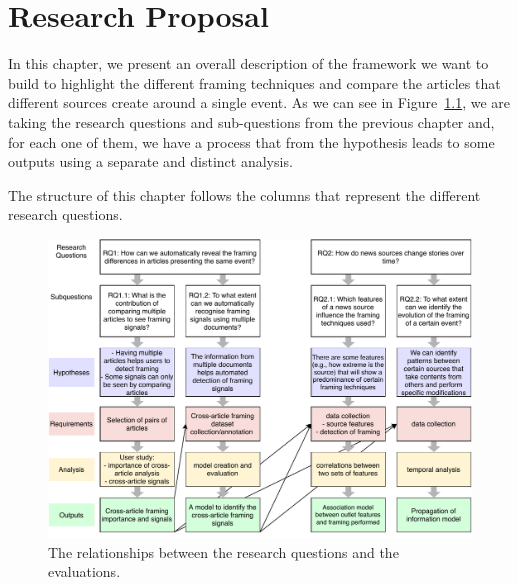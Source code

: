 \chapter{Research Proposal}
\label{chap:proposal}





In this chapter, we present an overall description of the framework we want to build to highlight the different framing techniques and compare the articles that different sources create around a single event.
As we can see in Figure~\ref{fig:diagram}, we are taking the research questions and sub-questions from the previous chapter and, for each one of them, we have a process that from the hypothesis leads to some outputs using a separate and distinct analysis.

The structure of this chapter follows the columns that represent the different research questions.

\begin{figure}[!htb]
    \centering
    \includegraphics[width=\linewidth]{figures/diagram-RQ.pdf}
    \caption{The relationships between the research questions and the evaluations.}
    \label{fig:diagram}
\end{figure}

